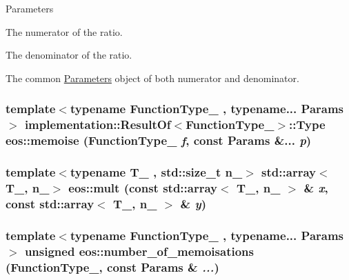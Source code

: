 \begin{DoxyParams}{Parameters}
\item[{\em numerator}]The numerator of the ratio. \item[{\em denominator}]The denominator of the ratio. \item[{\em parameters}]The common \hyperlink{classeos_1_1Parameters}{Parameters} object of both numerator and denominator. \end{DoxyParams}
\hypertarget{namespaceeos_a145cd9427e62a28f1144614e2b9a3d7d}{
\subsubsection[{memoise}]{\setlength{\rightskip}{0pt plus 5cm}template$<$typename FunctionType\_\- , typename... Params$>$ implementation::ResultOf$<$FunctionType\_\-$>$::Type eos::memoise (FunctionType\_\- {\em f}, \/  const Params \&... {\em p})}}
\label{namespaceeos_a145cd9427e62a28f1144614e2b9a3d7d}
\hypertarget{namespaceeos_ae34de7634e8e232a4a7761b998e1535f}{
\subsubsection[{mult}]{\setlength{\rightskip}{0pt plus 5cm}template$<$typename T\_\- , std::size\_\-t n\_\-$>$ std::array$<$T\_\-, n\_\-$>$ eos::mult (const std::array$<$ T\_\-, n\_\- $>$ \& {\em x}, \/  const std::array$<$ T\_\-, n\_\- $>$ \& {\em y})}}
\label{namespaceeos_ae34de7634e8e232a4a7761b998e1535f}
\hypertarget{namespaceeos_a82ca3bc4794ddeca0b97d4a66fa5a679}{
\subsubsection[{number\_\-of\_\-memoisations}]{\setlength{\rightskip}{0pt plus 5cm}template$<$typename FunctionType\_\- , typename... Params$>$ unsigned eos::number\_\-of\_\-memoisations (FunctionType\_\-, \/  const Params \& {\em ...})}}
\label{namespaceeos_a82ca3bc4794ddeca0b97d4a66fa5a679}
